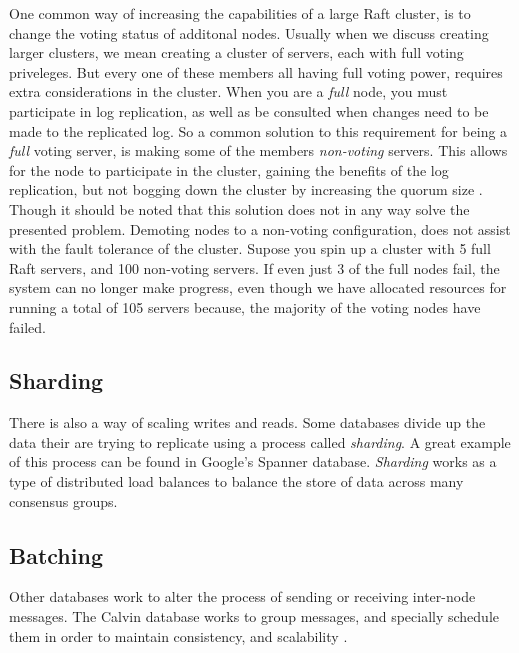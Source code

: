 One common way of increasing the capabilities of a large Raft cluster, is to change the voting status of additonal nodes.
Usually when we discuss creating larger clusters, we mean creating a cluster of servers, each with full voting priveleges.
But every one of these members all having full voting power, requires extra considerations in the cluster.
When you are a \textit{full} node, you must participate in log replication, as well as be consulted when changes need to be made to the replicated log.
So a common solution to this requirement for being a \textit{full} voting server, is making some of the members \textit{non-voting} servers.
This allows for the node to participate in the cluster, gaining the benefits of the log replication, but not bogging down the cluster by increasing the quorum size \cite{NonVoting}. 
Though it should be noted that this solution does not in any way solve the presented problem. Demoting nodes to a non-voting configuration, does not assist with the fault tolerance of the cluster. Supose you spin up a cluster with 5 full Raft servers, and 100 non-voting servers. If even just 3 of the full nodes fail, the system can no longer make progress, even though we have allocated resources for running a total of 105 servers because, the majority of the voting nodes have failed.

\subsection{Sharding}

There is also a way of scaling writes and reads. Some databases divide up the data their are trying to replicate using a process called \textit{sharding}. A great example of this process can be found in Google's Spanner database\cite{Spanner}. \textit{Sharding} works as a type of distributed load balances to balance the store of data across many consensus groups.

\subsection{Batching}

Other databases work to alter the process of sending or receiving inter-node messages. The Calvin database works to group messages, and specially schedule them in order to maintain consistency, and scalability \cite{Calvin}.